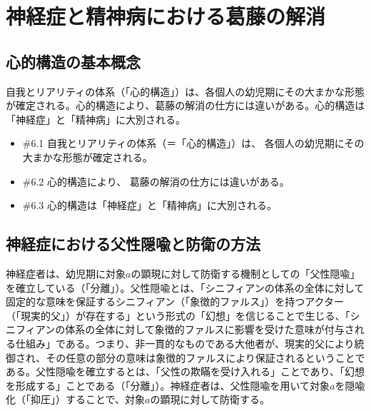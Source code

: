 \section{神経症と精神病における葛藤の解消}\label{ux795eux7d4cux75c7ux3068ux7cbeux795eux75c5ux306bux304aux3051ux308bux845bux85e4ux306eux89e3ux6d88}

\subsection{心的構造の基本概念}\label{ux5fc3ux7684ux69cbux9020ux306eux57faux672cux6982ux5ff5}

自我とリアリティの体系（「心的構造」）は、各個人の幼児期にその大まかな形態が確定される。心的構造により、葛藤の解消の仕方には違いがある。心的構造は「神経症」と「精神病」に大別される。

\begin{note}{}
  \begin{itemize}
    \tightlist
    \item{\#6.1}
      自我とリアリティの体系（＝「心的構造」）は、  各個人の幼児期にその大まかな形態が確定される。
    \item{\#6.2}
      心的構造により、  葛藤の解消の仕方には違いがある。
    \item{\#6.3}
      心的構造は「神経症」と「精神病」に大別される。
  \end{itemize}
\end{note}

\subsection{神経症における父性隠喩と防衛の方法}\label{ux795eux7d4cux75c7ux306bux304aux3051ux308bux7236ux6027ux96a0ux55a9ux3068ux9632ux885bux306eux65b9ux6cd5}

神経症者は、幼児期に対象\(a\)の顕現に対して防衛する機制としての「父性隠喩」を確立している（「分離」）。父性隠喩とは、「シニフィアンの体系の全体に対して固定的な意味を保証するシニフィアン（「象徴的ファルス」）を持つアクター（「現実的父」）が存在する」という形式の「幻想」を信じることで生じる、「シニフィアンの体系の全体に対して象徴的ファルスに影響を受けた意味が付与される仕組み」である。つまり、非一貫的なものである大他者が、現実的父により統御され、その任意の部分の意味は象徴的ファルスにより保証されるということである。父性隠喩を確立するとは、「父性の欺瞞を受け入れる」ことであり、「幻想を形成する」ことである（「分離」）。神経症者は、父性隠喩を用いて対象\(a\)を隠喩化（「抑圧」）することで、対象\(a\)の顕現に対して防衛する。

